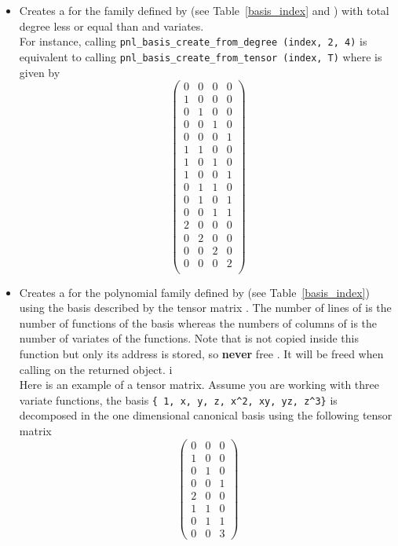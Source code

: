 \begin{itemize}
\item {}
  \sshortdescribe Creates a  for the family
  defined by  (see Table~\ref{basis_index} and ) with total degree less
  or equal than  and  variates.\\
  For instance, calling \verb!pnl_basis_create_from_degree (index, 2, 4)! is
  equivalent to calling \verb!pnl_basis_create_from_tensor (index, T)! where
   is given by
  \[ \left(
    \begin{array}{cccc}
      0 & 0 & 0 & 0\\
      1 & 0 & 0 & 0\\
      0 & 1 & 0 & 0\\
      0 & 0 & 1 & 0\\
      0 & 0 & 0 & 1\\
      1 & 1 & 0 & 0\\
      1 & 0 & 1 & 0\\
      1 & 0 & 0 & 1\\
      0 & 1 & 1 & 0\\
      0 & 1 & 0 & 1\\
      0 & 0 & 1 & 1\\
      2 & 0 & 0 & 0\\
      0 & 2 & 0 & 0\\
      0 & 0 & 2 & 0\\
      0 & 0 & 0 & 2\\
    \end{array}
  \right) \]


\item {}
  \sshortdescribe Creates a  for the polynomial family
  defined by  (see Table~\ref{basis_index}) using the basis
  described by the tensor matrix . The number of lines of  is
  the number of functions of the basis whereas the numbers of columns of
   is the number of variates of the functions.
  Note that  is not copied inside this function but only its address is
  stored, so {\bf never} free . It will be freed when calling
   on the returned object. i\\
  Here is an example of a tensor matrix. Assume you are working with three
  variate functions, the basis \verb!{ 1, x, y, z, x^2, xy, yz, z^3}! is
  decomposed in the one dimensional canonical basis using the following tensor
  matrix
  \[ \left(
    \begin{array}{ccc}
      0 & 0 & 0 \\
      1 & 0 & 0 \\
      0 & 1 & 0 \\
      0 & 0 & 1 \\
      2 & 0 & 0 \\
      1 & 1 & 0 \\
      0 & 1 & 1\\
      0 & 0 & 3
    \end{array}
  \right) \]


\end{itemize}
